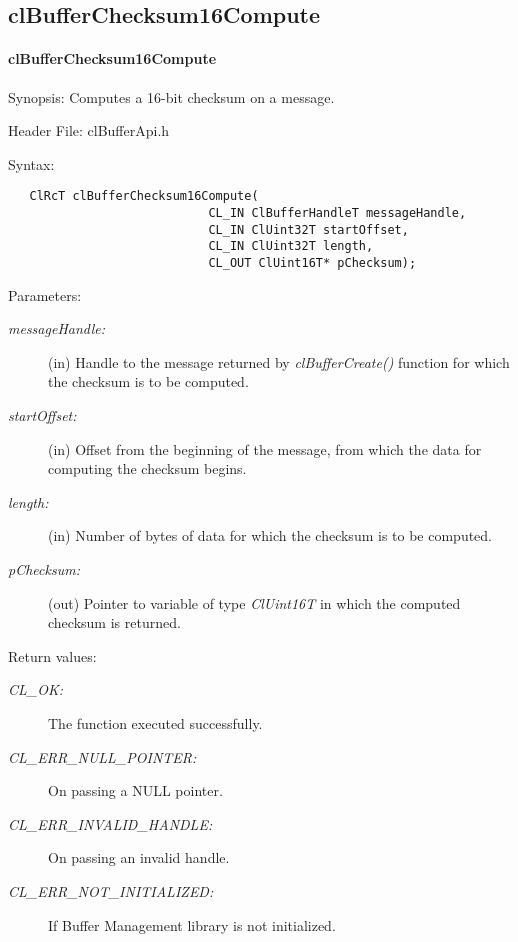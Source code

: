 \subsection{clBufferChecksum16Compute}
\hypertarget{pagebuf110}{}\paragraph{cl\-Buffer\-Checksum16Compute}\label{pagebuf110}
\begin{Desc}
\item[Synopsis:]Computes a 16-bit checksum on a message.\end{Desc}
\begin{Desc}
\item[Header File:]clBufferApi.h\end{Desc}
\begin{Desc}
\item[Syntax:]

\footnotesize\begin{verbatim}   ClRcT clBufferChecksum16Compute(
              				CL_IN ClBufferHandleT messageHandle,
              				CL_IN ClUint32T startOffset,
              				CL_IN ClUint32T length,
              				CL_OUT ClUint16T* pChecksum);
\end{verbatim}
\normalsize
\end{Desc}
\begin{Desc}
\item[Parameters:]
\begin{description}
\item[{\em message\-Handle:}](in) Handle to the message returned by \textit{clBufferCreate()} function for which the checksum is to be computed. 
\item[{\em start\-Offset:}](in) Offset from the beginning of the message, from which the data for computing the checksum begins. 
\item[{\em length:}](in) Number of bytes of data for which the checksum is to be computed. 
\item[{\em p\-Checksum:}](out) Pointer to variable of type {\em Cl\-Uint16T\/} in which the 
computed checksum is returned.\end{description}
\end{Desc}
\begin{Desc}
\item[Return values:]
\begin{description}
\item[{\em CL\_\-OK:}]The function executed successfully. 
\item[{\em CL\_\-ERR\_\-NULL\_\-POINTER:}]On passing a NULL pointer. 
\item[{\em CL\_\-ERR\_\-INVALID\_\-HANDLE:}]On passing an invalid handle. 
\item[{\em CL\_\-ERR\_\-NOT\_\-INITIALIZED:}]If Buffer Management library is not initialized.\end{description}
\end{Desc}
